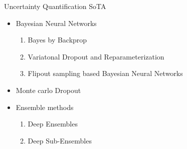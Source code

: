 \documentclass[10pt, aspectratio=169]{beamer}
\begin{document}
\begin{frame}{Uncertainty Quantification SoTA}
    \begin{itemize}
        \setlength{\itemsep}{5pt}
        \item Bayesian Neural Networks
        \begin{enumerate}
            \setlength{\itemsep}{5pt}
            \item Bayes by Backprop \citep{Blundell2015}
            \item Variatonal Dropout and Reparameterization \citep{Kingma2015}
            \item Flipout sampling based Bayesian Neural Networks \citep{Wen2018} 
        \end{enumerate}
        \item Monte carlo Dropout \citep{gal2016uncertainty}
        \item Ensemble methods
        \begin{enumerate}
            \setlength{\itemsep}{5pt}
            \item Deep Ensembles \citep{Lakshminarayanan2017}
            \item Deep Sub-Ensembles \citep{ValdenegroToro2019}
        \end{enumerate}
    \end{itemize}
    
\end{frame}
\end{document}
